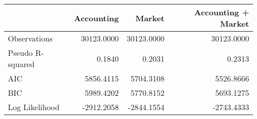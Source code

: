 \begin{tabular}{lrrr}
\toprule
 & Accounting & Market & Accounting + Market \\
\midrule
Observations & 30123.0000 & 30123.0000 & 30123.0000 \\
Pseudo R-squared & 0.1840 & 0.2031 & 0.2313 \\
AIC & 5856.4115 & 5704.3108 & 5526.8666 \\
BIC & 5989.4202 & 5770.8152 & 5693.1275 \\
Log Likelihood & -2912.2058 & -2844.1554 & -2743.4333 \\
\bottomrule
\end{tabular}
